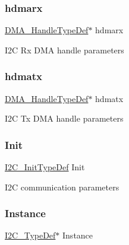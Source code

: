 \subsubsection{\texorpdfstring{hdmarx}{hdmarx}}
{\footnotesize\ttfamily \mbox{\hyperlink{group___d_m_a___exported___types_ga41b754a906b86bce54dc79938970138b}{D\+M\+A\+\_\+\+Handle\+Type\+Def}}$\ast$ hdmarx}

I2C Rx D\+MA handle parameters \mbox{\label{struct_i2_c___handle_type_def_a33e13c28b1a70e6164417abb026d7a22}} 
\subsubsection{\texorpdfstring{hdmatx}{hdmatx}}
{\footnotesize\ttfamily \mbox{\hyperlink{group___d_m_a___exported___types_ga41b754a906b86bce54dc79938970138b}{D\+M\+A\+\_\+\+Handle\+Type\+Def}}$\ast$ hdmatx}

I2C Tx D\+MA handle parameters \mbox{\label{struct_i2_c___handle_type_def_a4b1d65e692a280d15470a8184ed2f68a}} 
\subsubsection{\texorpdfstring{Init}{Init}}
{\footnotesize\ttfamily \mbox{\hyperlink{struct_i2_c___init_type_def}{I2\+C\+\_\+\+Init\+Type\+Def}} Init}

I2C communication parameters \mbox{\label{struct_i2_c___handle_type_def_a8bdec20782b6b99587806437094c43d2}} 
\subsubsection{\texorpdfstring{Instance}{Instance}}
{\footnotesize\ttfamily \mbox{\hyperlink{struct_i2_c___type_def}{I2\+C\+\_\+\+Type\+Def}}$\ast$ Instance}

